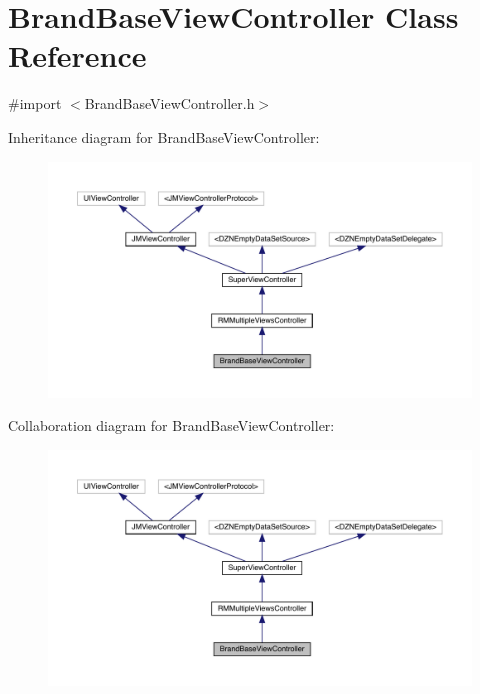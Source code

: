 \hypertarget{interface_brand_base_view_controller}{}\section{Brand\+Base\+View\+Controller Class Reference}
\label{interface_brand_base_view_controller}


{\ttfamily \#import $<$Brand\+Base\+View\+Controller.\+h$>$}



Inheritance diagram for Brand\+Base\+View\+Controller\+:\nopagebreak
\begin{figure}[H]
\begin{center}
\leavevmode
\includegraphics[width=350pt]{interface_brand_base_view_controller__inherit__graph}
\end{center}
\end{figure}


Collaboration diagram for Brand\+Base\+View\+Controller\+:\nopagebreak
\begin{figure}[H]
\begin{center}
\leavevmode
\includegraphics[width=350pt]{interface_brand_base_view_controller__coll__graph}
\end{center}
\end{figure}
